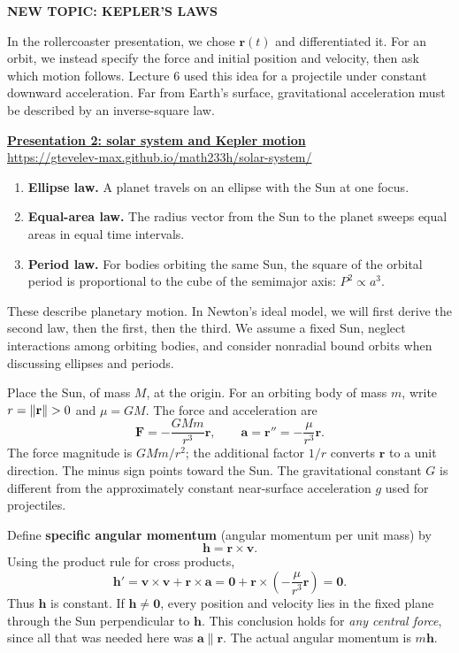\documentclass[11pt,letterpaper]{article}
\newcommand{\R}{\mathbf r}\newcommand{\V}{\mathbf v}\newcommand{\A}{\mathbf a}
\newcommand{\F}{\mathbf F}\newcommand{\HH}{\mathbf h}\newcommand{\X}{\mathbf x}
\newcommand{\heading}[1]{\vspace{3pt}{\large\bfseries #1}\par}
\newcommand{\tagline}[1]{{\small\bfseries\color{inkblue}#1}\par}
\newcommand{\demolink}[2]{\href{#1}{\textcolor{inkblue}{\textbf{#2}}}\\[-2pt]{\small\url{#1}}\par}
\begin{document}
\newpage
\tagline{NEW TOPIC: KEPLER'S LAWS}
\heading{From an assigned track to a force that determines motion}
In the rollercoaster presentation, we chose $\R(t)$ and differentiated it. For an orbit, we instead specify the force and initial position and velocity, then ask which motion follows. Lecture 6 used this idea for a projectile under constant downward acceleration. Far from Earth's surface, gravitational acceleration must be described by an inverse-square law.

\demolink{https://gtevelev-max.github.io/math233h/solar-system/}{Presentation 2: solar system and Kepler motion}

\heading{The three laws we will introduce and explain}
\begin{enumerate}
 \item \textbf{Ellipse law.} A planet travels on an ellipse with the Sun at one focus.
 \item \textbf{Equal-area law.} The radius vector from the Sun to the planet sweeps equal areas in equal time intervals.
 \item \textbf{Period law.} For bodies orbiting the same Sun, the square of the orbital period is proportional to the cube of the semimajor axis: $P^2\propto a^3$.
\end{enumerate}
These describe planetary motion. In Newton's ideal model, we will first derive the second law, then the first, then the third. We assume a fixed Sun, neglect interactions among orbiting bodies, and consider nonradial bound orbits when discussing ellipses and periods.

\heading{Newton's gravitational law}
Place the Sun, of mass $M$, at the origin. For an orbiting body of mass $m$, write $r=\norm{\R}>0$ and $\mu=GM$. The force and acceleration are
\[
 \boxed{\F=-\frac{GMm}{r^3}\R,\qquad
 \A=\R''=-\frac{\mu}{r^3}\R.}
\]
The force magnitude is $GMm/r^2$; the additional factor $1/r$ converts $\R$ to a unit direction. The minus sign points toward the Sun. The gravitational constant $G$ is different from the approximately constant near-surface acceleration $g$ used for projectiles.

\heading{A conserved vector fixes the orbital plane}
Define \textbf{specific angular momentum} (angular momentum per unit mass) by
\[
 \HH=\R\times\V.
\]
Using the product rule for cross products,
\[
 \HH'=\V\times\V+\R\times\A
 =\mathbf0+\R\times\left(-\frac{\mu}{r^3}\R\right)=\mathbf0.
\]
Thus $\HH$ is constant. If $\HH\ne\mathbf0$, every position and velocity lies in the fixed plane through the Sun perpendicular to $\HH$. This conclusion holds for \emph{any central force}, since all that was needed here was $\A\parallel\R$. The actual angular momentum is $m\HH$.
\end{document}
